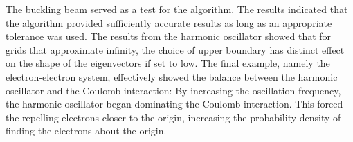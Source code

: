 \documentclass[reprint,english]{revtex4-1}
\begin{document}
The buckling beam served as a test for the algorithm. The results indicated that the algorithm provided sufficiently accurate results as long as an appropriate tolerance was used. The results from the harmonic oscillator showed that for grids that approximate infinity, the choice of upper boundary has distinct effect on the shape of the eigenvectors if set to low. The final example, namely the electron-electron system, effectively showed the balance between the harmonic oscillator and the Coulomb-interaction: By increasing the oscillation frequency, the harmonic oscillator began dominating the Coulomb-interaction. This forced the repelling electrons closer to the origin, increasing the probability density of finding the electrons about the origin.

\nocite{lecture_ode}\nocite{lecture_linalg}\nocite{eigenvalues}


\end{document}
